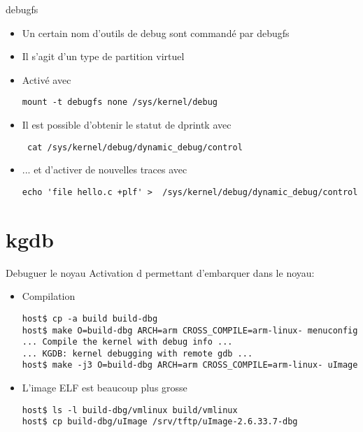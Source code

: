 \begin{frame}[fragile=singleslide]{debugfs}
  \begin{itemize} 
  \item Un certain nom d'outils de debug sont commandé par debugfs
  \item Il s'agit d'un type de partition virtuel
  \item Activé avec 
    \begin{lstlisting} 
mount -t debugfs none /sys/kernel/debug
    \end{lstlisting} 
  \item Il est possible d'obtenir le statut de dprintk avec
    \begin{lstlisting} 
 cat /sys/kernel/debug/dynamic_debug/control
    \end{lstlisting} 
  \item ... et d'activer de nouvelles traces avec 
    \begin{lstlisting} 
echo 'file hello.c +plf' >  /sys/kernel/debug/dynamic_debug/control
    \end{lstlisting} 
  \end{itemize} 
\end{frame} 


\section{kgdb}

\begin{frame}[fragile=singleslide]{Debuguer le noyau}
  Activation d  permettant d'embarquer  dans
  le noyau:
  \begin{itemize}
  \item Compilation
    \begin{lstlisting}
host$ cp -a build build-dbg
host$ make O=build-dbg ARCH=arm CROSS_COMPILE=arm-linux- menuconfig
... Compile the kernel with debug info ...
... KGDB: kernel debugging with remote gdb ...
host$ make -j3 O=build-dbg ARCH=arm CROSS_COMPILE=arm-linux- uImage
    \end{lstlisting} 
  \item L'image ELF est beaucoup plus grosse
    \begin{lstlisting}
host$ ls -l build-dbg/vmlinux build/vmlinux
host$ cp build-dbg/uImage /srv/tftp/uImage-2.6.33.7-dbg
    \end{lstlisting} 
  \end{itemize}
\end{frame}

